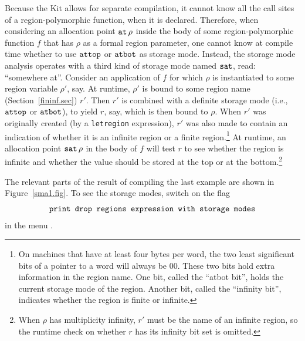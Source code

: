 \documentclass[12pt]{book}
\begin{document}
Because the Kit allows for separate compilation, it cannot know all
the call sites of a region-polymorphic function, when it is declared.
Therefore, when considering an allocation point $\mathbin{\hbox{\tt at}}\,\rho$ inside the
body of some region-polymorphic function $f$ that has $\rho$ as a
formal region parameter, one cannot know at compile time whether to
use $\hbox{\tt attop}$ or $\hbox{\tt atbot}$ as storage mode.  Instead, the storage mode
analysis operates with a third kind of storage mode named $\hbox{\tt sat}$,
read: ``somewhere at''. Consider an application of $f$ for which
$\rho$ is instantiated to some region variable $\rho'$, say. At
runtime, $\rho'$ is bound to some region name
(Section~\ref{fininf.sec}) $r'$.  Then $r'$ is combined with a
definite storage mode (i.e., $\hbox{\tt attop}$ or $\hbox{\tt atbot}$), to yield $r$, say,
which is then bound to $\rho$.  When $r'$ was originally created (by a
{\tt letregion} expression), $r'$ was also made to contain an
indication of whether it is an infinite region or a finite
region.\footnote{On machines\label{atbit.lab} that have at least four
  bytes per word, the two least significant bits of a pointer to a
  word will always be 00. These two bits hold extra information in the
  region name.  One bit, called the ``atbot bit'',
  holds the current storage mode of the region. Another bit, called
  the ``infinity bit'', indicates whether the region is finite or
  infinite.}  At runtime, an allocation point $\hbox{\tt sat}\,\rho$ in the body
of $f$ will test $r$ to see whether the region is infinite and whether
the value should be stored at the top or at the bottom.\footnote{When
  $\rho$ has multiplicity infinity, $r'$ must be the name of an
  infinite region, so the runtime check on whether $r$ has its
  infinity bit set is omitted.}

The relevant parts of the result of compiling the last example are
shown in Figure~\ref{sma1.fig}.  To see the storage modes, switch on
the flag
$$\hbox{\tt print drop regions expression with storage modes}$$
in the menu .

\end{document}
